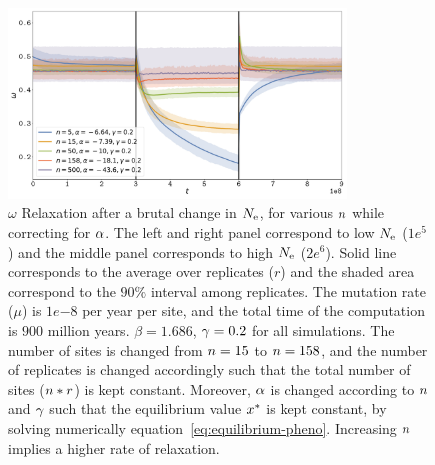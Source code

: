 \documentclass{article}
\begin{document}
\begin{figure}[H]
    \centering
    \includegraphics[width=0.8\textwidth] {Relaxation-Stability-Alpha.pdf}
    \caption[Relaxation time of $\omega$ dependence on $\NbrSites$, while correction for $\DeltaGmin$]{
    $\omega$ Relaxation after a brutal change in $N_{\text{e}}$, for various $\NbrSites$ while correcting for $\DeltaGmin$.
    The left and right panel correspond to low $N_{\text{e}}$ ($1e^{5}$) and the middle panel corresponds to high $N_{\text{e}}$ ($2e^{6}$).
    Solid line corresponds to the average over replicates ($r$) and the shaded area correspond to the $90\%$ interval among replicates.
    The mutation rate ($\mu$) is $1e{-8}$ per year per site, and the total time of the computation is $900$ million years.
    $\beta=1.686$, $\gamma=0.2$ for all simulations. The number of sites is changed from $n=15$ to $n=158$, and the number of replicates is changed accordingly such that the total number of sites ($n*r$) is kept constant.
    Moreover, $\DeltaGmin$ is changed according to $\NbrSites$ and $\gamma$ such that the equilibrium value $x^{*}$ is kept constant, by solving numerically equation~\ref{eq:equilibrium-pheno}.
    Increasing $\NbrSites$ implies a higher rate of relaxation.}
\end{figure}
\end{document}
